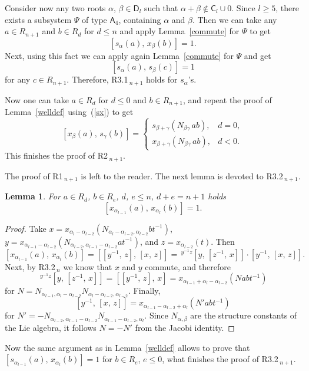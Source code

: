 \documentclass[oneside, 8pt]{amsart}
\newtheorem{lemma}{Lemma}
\theoremstyle{remark}
\theoremstyle{definition}
\newcommand{\inv}{^{-1}}
\newcommand{\rA}{\mathsf{A}}
\newcommand{\rC}{\mathsf{C}}
\newcommand{\rD}{\mathsf{D}}
\numberwithin{equation}{section}
\begin{document}
Consider now any two roots $\alpha$, $\beta\in\rD_l$ such that $\alpha+\beta\not\in\rC_l\cup0$. Since $l\geq5$, there exists a subsystem $\Psi$ of type $\rA_4$, containing $\alpha$ and $\beta$. Then we can take any $a\in R_{n+1}$ and $b\in R_d$ for $d\leq n$ and apply Lemma~\ref{commute} for $\Psi$ to get
\begin{equation} \label{sx} [s_\alpha(a),\,x_\beta(b)]=1. \end{equation}
Next, using this fact we can apply again Lemma~\ref{commute} for $\Psi$ and get
\[ [s_\alpha(a),\,s_\beta(c)]=1 \]
for any $c\in R_{n+1}$. Therefore, R3.1$\!\,_{n+1}$ holds for $s_\alpha$'s.

Now one can take $a\in R_d$ for $d\leq0$ and $b\in R_{n+1}$, and repeat the proof of Lemma~\ref{welldef} using~(\ref{sx}) to get
\[ [x_\beta(a),\,s_\gamma(b)]=\begin{cases}s_{\beta+\gamma}(N_{\beta\gamma}\,ab),&d=0,\\x_{\beta+\gamma}(N_{\beta\gamma}\,ab),&d<0.\end{cases} \]
This finishes the proof of R2$\!\,_{n+1}$.

The proof of R1$\!\,_{n+1}$ is left to the reader. The next lemma is devoted to R3.2$\!\,_{n+1}$.

\begin{lemma} For $a\in R_d$, $b\in R_e$, $d$, $e\leq n$, $d+e=n+1$ holds \[ [x_{\alpha_{l-1}}(a),\,x_{\alpha_l}(b)]=1. \] \end{lemma}
\begin{proof} Take $x=x_{\alpha_{l}-\alpha_{l-2}}(N_{\alpha_{l}-\alpha_{l-2},\alpha_{l-2}}bt\inv)$, $y=x_{\alpha_{l-1}-\alpha_{l-2}}(N_{\alpha_{l-2},\alpha_{l-1}-\alpha_{l-2}}at\inv)$, and $z=x_{\alpha_{l-2}}(t)$. Then
\[ [x_{\alpha_{l-1}}(a),\,x_{\alpha_l}(b)]=[[y\inv,\,z],\,[x,\,z]]=\,^{y\inv z}[y,\,[z\inv,\,x]]\cdot[y\inv,\,[x,\,z]]. \]
Next, by R3.2$\!\,_n$ we know that $x$ and $y$ commute, and therefore 
\[ \,^{y\inv z}[y,\,[z\inv,\,x]]=[[y\inv,\,z],\,x]=x_{\alpha_{l-1}+\alpha_{l}-\alpha_{l-2}}(Nabt\inv) \]
for $N=N_{\alpha_{l-1},\alpha_{l}-\alpha_{l-2}}N_{\alpha_{l}-\alpha_{l-2},\alpha_{l-2}}$. Finally,
\[ [y\inv,\,[x,\,z]]=x_{\alpha_{l-1}-\alpha_{l-2}+\alpha_l}(N'abt\inv) \]
for $N'=-N_{\alpha_{l-2},\alpha_{l-1}-\alpha_{l-2}}N_{{\alpha_{l-1}-\alpha_{l-2}},\alpha_l}$. Since $N_{\alpha,\beta}$ are the structure constants of the Lie algebra, it follows $N=-N'$ from the Jacobi identity.
\end{proof}

Now the same argument as in Lemma~\ref{welldef} allows to prove that $[s_{\alpha_{l-1}}(a),\,x_{\alpha_l}(b)]=1$ for $b\in R_e$, $e\leq0$, what finishes the proof of R3.2$\!\,_{n+1}$.
\end{document}
